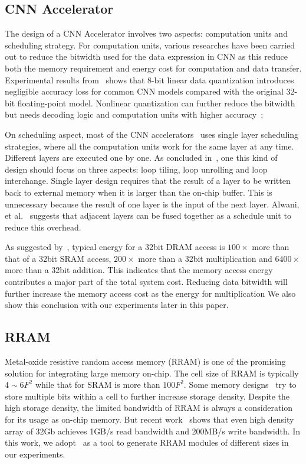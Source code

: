 \subsection{CNN Accelerator}
The design of a CNN Accelerator involves two aspects: computation units and scheduling strategy. For computation units, various researches have been carried out to reduce the bitwidth used for the data expression in CNN as this reduce both the memory requirement and energy cost for computation and data transfer. Experimental results from~\cite{guo2017software} shows that 8-bit linear data quantization introduces negligible accuracy loss for common CNN models compared with the original 32-bit floating-point model. Nonlinear quantization can further reduce the bitwidth~\cite{han2015deep} but needs decoding logic and computation units with higher accuracy~\cite{eie};

On scheduling aspect, most of the CNN accelerators~\cite{zhang2015optimizing}\cite{qiu2016going}\cite{ma2017optimizing} uses single layer scheduling strategies, where all the computation units work for the same layer at any time. Different layers are executed one by one. As concluded in~\cite{ma2017optimizing}, one this kind of design should focus on three aspects: loop tiling, loop unrolling and loop interchange. Single layer design requires that the result of a layer to be written back to external memory when it is larger than the on-chip buffer. This is unnecessary because the result of one layer is the input of the next layer. Alwani, et al.~\cite{alwani2016fused} suggests that adjacent layers can be fused together as a schedule unit to reduce this overhead.

As suggested by~\cite{mac_energy}, typical energy for a 32bit DRAM access is $100\times$ more than that of a 32bit SRAM access, $200\times$ more than a 32bit multiplication and $6400\times$ more than a 32bit addition. This indicates that the memory access energy contributes a major part of the total system cost. Reducing data bitwidth will further increase the memory access cost as the energy for multiplication We also show this conclusion with our experiments later in this paper.

\subsection{RRAM}
Metal-oxide resistive random access memory (RRAM) is one of the promising solution for integrating large memory on-chip. The cell size of RRAM is typically $4\sim 6F^2$ while that for SRAM is more than $100F^2$. Some memory designs~\cite{chien2009multi}\cite{chien2011multi} try to store multiple bits within a cell to further increase storage density. Despite the high storage density, the limited bandwidth of RRAM is always a consideration for its usage as on-chip memory. But recent work~\cite{fackenthal201419} shows that even high density array of 32Gb achieves 1GB/s read bandwidth and 200MB/s write bandwidth. In this work, we adopt~\cite{dong2014nvsim} as a tool to generate RRAM modules of different sizes in our experiments.